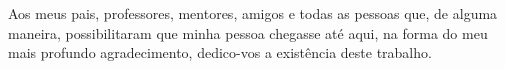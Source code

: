 \begin{dedicatoria}
    \vspace*{\fill}
    \noindent
    \raggedleft
    \begin{minipage}{.54\textwidth}
        Aos meus pais, professores, mentores, amigos e todas as pessoas que, de alguma maneira, possibilitaram que minha pessoa chegasse até aqui, na forma do meu mais profundo agradecimento, dedico-vos a existência deste trabalho.
    \end{minipage}
\end{dedicatoria}
